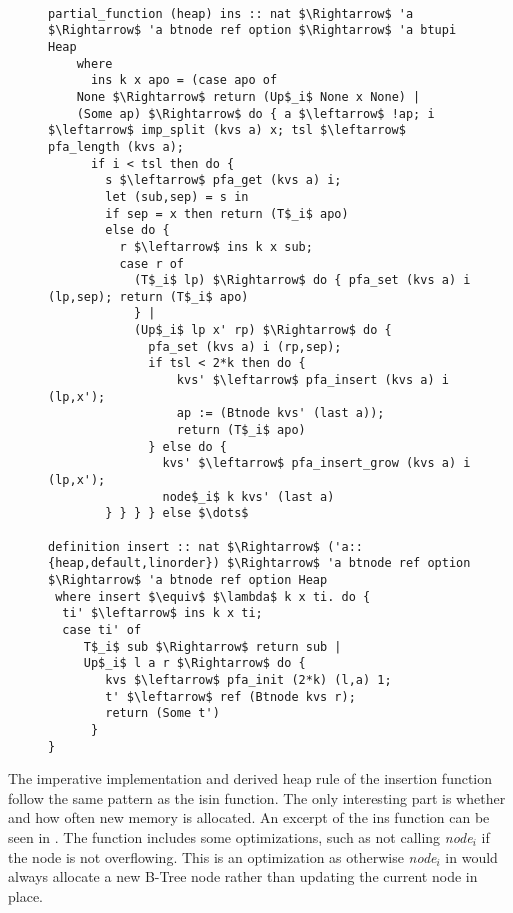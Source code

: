 \begin{figure}
\begin{lstlisting}[mathescape=true, language=Isabelle, label={lst:imp-ins-fun},
    caption={Excerpt of the imperative insert function}]

partial_function (heap) ins :: nat $\Rightarrow$ 'a $\Rightarrow$ 'a btnode ref option $\Rightarrow$ 'a btupi Heap 
    where 
      ins k x apo = (case apo of 
    None $\Rightarrow$ return (Up$_i$ None x None) | 
    (Some ap) $\Rightarrow$ do { a $\leftarrow$ !ap; i $\leftarrow$ imp_split (kvs a) x; tsl $\leftarrow$ pfa_length (kvs a); 
      if i < tsl then do { 
        s $\leftarrow$ pfa_get (kvs a) i; 
        let (sub,sep) = s in 
        if sep = x then return (T$_i$ apo) 
        else do { 
          r $\leftarrow$ ins k x sub; 
          case r of  
            (T$_i$ lp) $\Rightarrow$ do { pfa_set (kvs a) i (lp,sep); return (T$_i$ apo) 
            } | 
            (Up$_i$ lp x' rp) $\Rightarrow$ do { 
              pfa_set (kvs a) i (rp,sep); 
              if tsl < 2*k then do { 
                  kvs' $\leftarrow$ pfa_insert (kvs a) i (lp,x'); 
                  ap := (Btnode kvs' (last a)); 
                  return (T$_i$ apo) 
              } else do { 
                kvs' $\leftarrow$ pfa_insert_grow (kvs a) i (lp,x'); 
                node$_i$ k kvs' (last a) 
        } } } } else $\dots$

definition insert :: nat $\Rightarrow$ ('a::{heap,default,linorder}) $\Rightarrow$ 'a btnode ref option $\Rightarrow$ 'a btnode ref option Heap
 where insert $\equiv$ $\lambda$ k x ti. do {
  ti' $\leftarrow$ ins k x ti;
  case ti' of
     T$_i$ sub $\Rightarrow$ return sub |
     Up$_i$ l a r $\Rightarrow$ do {
        kvs $\leftarrow$ pfa_init (2*k) (l,a) 1;
        t' $\leftarrow$ ref (Btnode kvs r);
        return (Some t')
      }
}

\end{lstlisting}
\end{figure}

The imperative implementation and derived heap rule of the insertion function follow
the same pattern as the isin function.
The only interesting part is whether and how often new memory is allocated.
An excerpt of the ins function can be seen in .
The function includes some optimizations, such as not calling
\textit{node$_i$} if the node is not overflowing.
This is an optimization as otherwise \textit{node$_i$} in
 would always allocate a new B-Tree node
rather than updating the current node in place.

